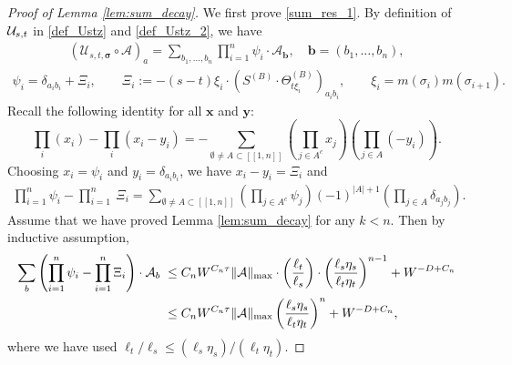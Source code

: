 \documentclass[10pt,reqno]{article}
\theoremstyle{plain} %
\theoremstyle{remark}
\numberwithin{equation}{section}
\begin{document}
\begin{proof}[Proof of Lemma \ref{lem:sum_decay}]
We first prove \eqref{sum_res_1}.  By definition of ${\cal U}_{s, t}$ in \eqref{def_Ustz} and \eqref{def_Ustz_2}, we have 
\begin{align}
      \left(\mathcal{U}_{s, t, \boldsymbol{\sigma}} \circ \mathcal{A}\right)_a=\sum_{b_1, \ldots, b_n} \prod_{i=1}^n\psi_i  \cdot \mathcal{A}_{\boldsymbol{b}}, \quad \boldsymbol{b}=\left(b_1, \ldots, b_n\right),
\end{align}
\begin{align}\label{def_psixi}
     \psi_i=\delta_{a_ib_i}+\Xi_i,  \quad \quad 
\Xi_i:=-(s-t)\xi_i \cdot \left(S^{(B)}\cdot \Theta^{(B)}_{t \xi_i}\right)_{a_ib_i},\quad\quad \xi_i=m(\sigma_i)m(\sigma_{i+1}).
 \end{align} 
Recall the following identity for all $\textbf{x}$ and $\textbf{y}$:
$$
\prod_i(x_i)-\prod_i (x_i-y_i) 
=-\sum_{\emptyset\ne A\subset[[1,n]]}\left(\prod_{j\in A^c}x_j \right)
\left(\prod_{j\in A }(-y_i)\right).
$$
Choosing   $x_i=\psi_i$ and $y_i=\delta_{a_ib_i}$, we have  $x_i-y_i=\Xi_i$ and  
 \begin{align}
    \prod_{i=1}^n  \psi_i 
    -\prod_{i=1}^n \ \Xi_i = \sum_{\emptyset\ne A\subset[[1,n]]}\left(\prod_{j\in A^c}\psi_j \right)
(-1)^{|A|+1}\left(\prod_{j\in A }\delta_{a_jb_j} \right).
\end{align}
Assume that we have proved Lemma \ref{lem:sum_decay} for any $k<n$.  Then by  inductive assumption, 
\begin{align}\label{iukwjn}
\sum_{\textbf{b}} \left(\prod_{i=1}^n  \psi_i- \prod_{i=1}^n  \Xi_i\right) \cdot 
{\cal A}_{\textbf{b}} 
 \; \le \; & C_n W^{C_n\tau}\|{\cal A}\|_{\max}\cdot \left(\frac{\ell_t}{\ell_s}\right) 
    \cdot \left(\frac{\ell_s\eta_s}{\ell_t\eta_t}\right)^{n-1 } +W^{-D+C_n}
    \\\nonumber
  \; \le \; &  C_n W^{C_n\tau}\|{\cal A}\|_{\max}\left(\frac{\ell_s\eta_s}{\ell_t\eta_t}\right)^{n  }    +W^{-D+C_n} ,  
\end{align}
where we have used $\ell_t/\ell_s\le \left( \ell_s\eta_s\right)/\left(\ell_t\eta_t\right)$. 


\end{proof}
\end{document}
